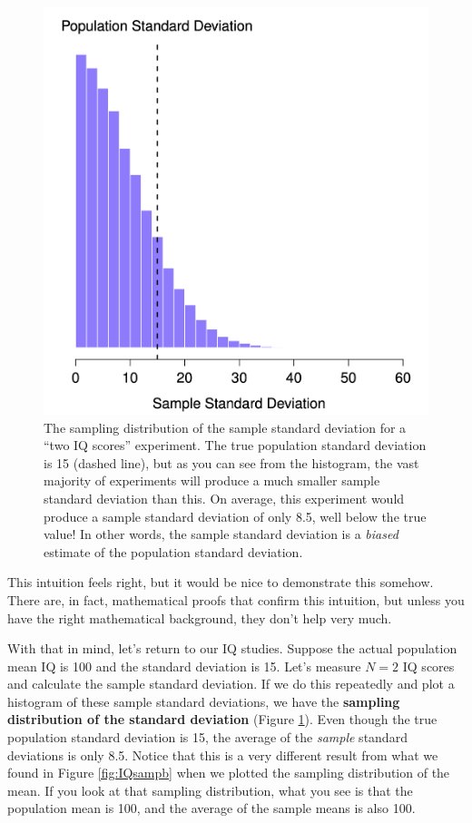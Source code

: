 \documentclass[
  11pt,
  a4paper,
  twoside,symmetric,openright]{book}
\theoremstyle{break}
\theoremstyle{break}
\begin{document}
\begin{figure}

{\centering \includegraphics[width=0.6\linewidth]{resources/image/samplingDistSampleSD} 

}

\caption{The sampling distribution of the sample standard deviation for a ``two IQ scores'' experiment. The true population standard deviation is 15 (dashed line), but as you can see from the histogram, the vast majority of experiments will produce a much smaller sample standard deviation than this. On average, this experiment would produce a sample standard deviation of only 8.5, well below the true value! In other words, the sample standard deviation is a \emph{biased} estimate of the population standard deviation.}\label{fig:sampdistsd}
\end{figure}

This intuition feels right, but it would be nice to demonstrate this somehow. There are, in fact, mathematical proofs that confirm this intuition, but unless you have the right mathematical background, they don't help very much.

With that in mind, let's return to our IQ studies. Suppose the actual population mean IQ is 100 and the standard deviation is 15. Let's measure \(N=2\) IQ scores and calculate the sample standard deviation. If we do this repeatedly and plot a histogram of these sample standard deviations, we have the \textbf{sampling distribution of the standard deviation} (Figure \ref{fig:sampdistsd}). Even though the true population standard deviation is 15, the average of the \emph{sample} standard deviations is only 8.5. Notice that this is a very different result from what we found in Figure \ref{fig:IQsampb} when we plotted the sampling distribution of the mean. If you look at that sampling distribution, what you see is that the population mean is 100, and the average of the sample means is also 100.
\end{document}
